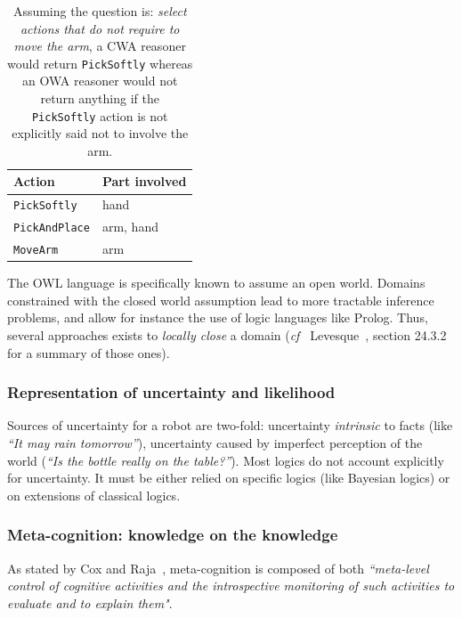 \documentclass[a4paper, twocolumn]{article}
\newcommand{\cf}{{\textit{cf~}}}
\begin{document}
\begin{table}
    \begin{center}
    \begin{tabular}{ll}
    {\bf Action} & {\bf Part involved} \\
    \hline
    {\tt PickSoftly} & hand \\
    {\tt PickAndPlace} & arm, hand \\
    {\tt MoveArm} & arm \\
    \hline
    \end{tabular}
    \end{center}
    \caption{Assuming the question is: \emph{select actions that do not require
    to move the arm}, a CWA reasoner would return {\tt PickSoftly} whereas an
    OWA reasoner would not return anything if the {\tt PickSoftly} action is
    not explicitly said not to involve the arm.}
    \label{table|cwa-owa-example}
\end{table}

The OWL language is specifically known to assume an open world.  Domains
constrained with the closed world assumption lead to more tractable inference
problems, and allow for instance the use of logic languages like Prolog. Thus,
several approaches exists to \emph{locally close} a domain (\cf
Levesque~\cite{Levesque2008}, section 24.3.2 for a summary of those ones).

\subsubsection{Representation of uncertainty and likelihood}

Sources of uncertainty for a robot are two-fold: uncertainty \emph{intrinsic}
to facts (like \emph{``It may rain tomorrow''}), uncertainty caused by
imperfect perception of the world (\emph{``Is the bottle really on the
table?''}). Most logics do not account explicitly for uncertainty. It must be
either relied on specific logics (like Bayesian logics) or on extensions of
classical logics.


\subsubsection{Meta-cognition: knowledge on the knowledge}

As stated by Cox and Raja~\cite{Cox2007}, meta-cognition is composed of both
\emph{``meta-level control of cognitive activities and the introspective
monitoring of such activities to evaluate and to explain them"}.
\end{document}
